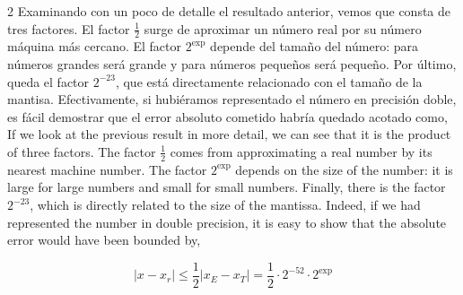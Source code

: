 \begin{paracol}{2}
Examinando con un poco de detalle el resultado anterior, vemos que consta de tres factores. El factor $\frac{1}{2}$ surge de aproximar un número real por su número máquina más cercano. El factor $2^\text{exp}$ depende del tamaño del número: para números grandes será grande y para números pequeños será pequeño. Por último, queda el factor $2^{-23}$, que está directamente relacionado con el tamaño de la mantisa. Efectivamente, si hubiéramos representado el número en precisión doble, es fácil demostrar que el error absoluto cometido habría quedado acotado como,
\switchcolumn
If we look at the previous result in more detail, we can see that it is the product of three factors. The factor $\frac{1}{2}$ comes from approximating a real number by its nearest machine number. The factor $2^\text{exp}$ depends on the size of the number: it is large for large numbers and small for small numbers. Finally, there is the factor $2^{-23}$, which is directly related to the size of the mantissa. Indeed, if we had represented the number in double precision, it is easy to show that the absolute error would have been bounded by,
\end{paracol}
 \begin{equation*}
\vert x-x_r \vert \leq \frac{1}{2}\vert x_E-x_T \vert= \frac{1}{2}\cdot 2^{-52}\cdot 2^\text{exp}
\end{equation*}

